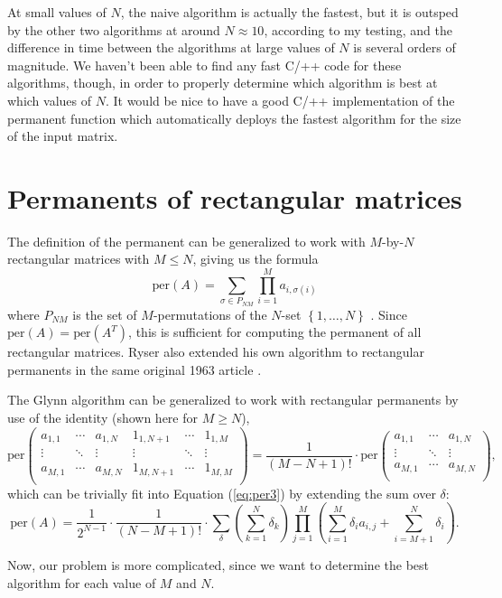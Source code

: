 \documentclass{article}
\begin{document}
At small values of $N$, the naive algorithm is actually the fastest, but it is outsped by the other
two algorithms at around $N \approx 10$, according to my testing, and the difference in time between
the algorithms at large values of $N$ is several orders of magnitude. We haven't been able to find
any fast C/++ code for these algorithms, though, in order to properly determine which algorithm is
best at which values of $N$. It would be nice to have a good C/++ implementation of the permanent
function which automatically deploys the fastest algorithm for the size of the input matrix.

\section*{Permanents of rectangular matrices}

The definition of the permanent can be generalized to work with $M$-by-$N$ rectangular
matrices with $M \leq N$, giving us the formula
\begin{equation} \label{eq:rectper1}
    \text{per}(A) = \sum_{\sigma \in P_{NM}}{\prod_{i=1}^M{a_{i,{\sigma(i)}}}}
\end{equation}
where $P_{NM}$ is the set of $M$-permutations of the $N$-set $\left\{1,\dots,N\right\}$
\cite{wiki:permanent}.  Since $\text{per}(A) = \text{per}(A^T)$, this is sufficient for computing
the permanent of all rectangular matrices. Ryser also extended his own algorithm to rectangular
permanents in the same original 1963 article \cite{wiki:computing,ryser1963}.

The Glynn algorithm can be generalized to work with rectangular permanents by use of the
identity (shown here for $M \geq N$),
\begin{equation}
    {\text{per}}\left(
        \begin{matrix}
            a_{1,1} & \cdots & a_{1,N} & 1_{1,N+1} & \cdots & 1_{1,M} \\
            \vdots & \ddots & \vdots & \vdots & \ddots & \vdots \\
            a_{M,1} & \cdots & a_{M,N} & 1_{M,N+1} & \cdots & 1_{M,M} \\
        \end{matrix}
    \right)
    = \frac{1}{\left(M - N + 1\right)!} \cdot {\text{per}}\left(
        \begin{matrix}
            a_{1,1} & \cdots & a_{1,N} \\
            \vdots & \ddots & \vdots \\
            a_{M,1} & \cdots & a_{M,N} \\
        \end{matrix}
    \right),
\end{equation}
which can be trivially fit into Equation (\ref{eq:per3}) by extending the sum over $\delta$:
\begin{equation} \label{eq:rectper3}
    \text{per}(A) = \frac{1}{2^{N-1}} \cdot \frac{1}{\left(N - M + 1\right)!} \cdot \sum_{\delta}{
        \left(\sum_{k=1}^N{\delta_k}\right)
        \prod_{j=1}^M{\left(\sum_{i=1}^M{\delta_i a_{i,j}} + \sum_{i=M+1}^N{\delta_i}\right)}
    }.
\end{equation}

Now, our problem is more complicated, since we want to determine the best algorithm for each value
of $M$ and $N$.



\end{document}
